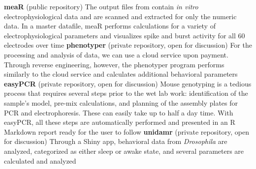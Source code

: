 \documentclass[
  a4paper, 
   maincolor=cvblue,
   sectioncolor=cvblue,
]{fortysecondscv}
\begin{document}
\textbf{meaR} (public repository) \newline
The output files from \href{https://www.multichannelsystems.com/products/vitro-mea-systems}{\color{blue}{Multi-Electrode Arrays}} contain \emph{in vitro} electrophysiological data and are scanned and extracted for only the numeric data. In a master datafile, meaR performs calculations for a variety of electrophysiological parameters and visualizes spike and burst activity for all 60 electrodes over time \newline\newline
\textbf{phenotyper} (private repository, open for discussion) \newline
For the processing and analysis of \href{https://www.sylics.com/bioinformatics/cognitionwall/}{\color{blue}{Phenotyper}} data, we can use a cloud service upon payment. Through reverse engineering, however, the phenotyper program performs similarly to the cloud service and calculates additional behavioral parameters \newline\newline
\textbf{easyPCR} (private repository, open for discussion) \newline
Mouse genotyping is a tedious process that requires several steps prior to the wet lab work:  identification of the sample's model, pre-mix calculations, and planning of the assembly plates for PCR and electrophoresis. These can easily take up to half a day time. With easyPCR, all these steps are automatically performed and presented in an R Markdown report ready for the user to follow \newline\newline
\textbf{unidamr} (private repository, open for discussion) \newline
Through a Shiny app, behavioral data from \emph{Drosophila} are analyzed, categorized as either sleep or awake state, and several parameters are calculated and analyzed

\newpage
\makebacksidebar


\end{document}
